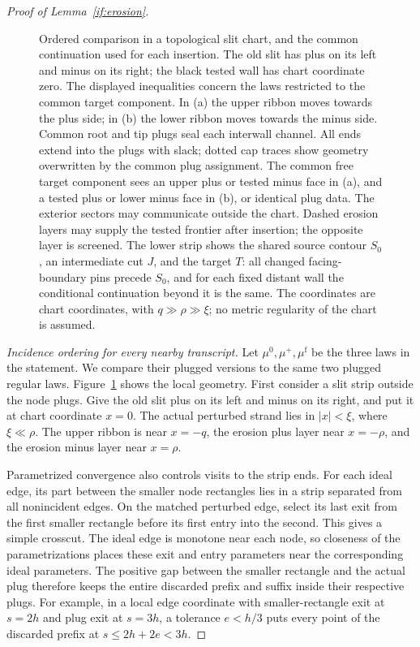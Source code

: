 \begin{proof}[Proof of Lemma~\ref{if:erosion}]
\begin{figure}[!htbp]
\centering

\caption{Ordered comparison in a topological slit chart, and the common
continuation used for each insertion. The old slit has plus on its left
and minus on its right; the black tested wall has chart coordinate zero.
The displayed inequalities concern the laws restricted to the common
target component. In (a) the upper ribbon moves towards the plus
side; in (b) the lower ribbon moves towards the minus side. Common root
and tip plugs seal each interwall channel. All ends extend into the
plugs with slack; dotted cap traces show geometry overwritten by the
common plug assignment. The common free target component sees an upper
plus or tested minus face in (a), and a tested plus or lower minus face
in (b), or identical plug data. The exterior sectors may communicate
outside the chart. Dashed erosion layers may supply the tested frontier
after insertion; the opposite layer is screened. The lower strip shows
the shared source contour $S_0$, an intermediate cut $J$, and the target
$T$: all changed facing-boundary pins precede $S_0$, and for each fixed
distant wall the conditional continuation beyond it is the same. The
coordinates are chart coordinates, with $q\gg\rho\gg\xi$; no metric
regularity of the chart is assumed.}
\label{if:slit-figure}
\end{figure}

\emph{Incidence ordering for every nearby transcript.}
Let $\mu^0,\mu^+,\mu^{\mathrm f}$ be the three laws in the statement.
We compare their plugged versions to the same two plugged regular
laws. Figure~\ref{if:slit-figure} shows the local geometry. First
consider a slit strip outside the node plugs. Give the old slit plus
on its left and minus on its right, and put it at chart coordinate
$x=0$. The actual perturbed strand lies in $|x|<\xi$, where
$\xi\ll\rho$. The upper ribbon is near $x=-q$, the erosion plus
layer near $x=-\rho$, and the erosion minus layer near $x=\rho$.

Parametrized convergence also controls visits to the strip ends.
For each ideal edge, its part between the smaller node rectangles
lies in a strip separated from all nonincident edges. On the matched
perturbed edge, select its last exit from the first smaller rectangle
before its first entry into the second. This gives a simple crosscut.
The ideal edge is monotone near each node, so closeness of the
parametrizations places these exit and entry parameters near the
corresponding ideal parameters. The positive gap between the smaller
rectangle and the actual plug therefore keeps the entire discarded
prefix and suffix inside their respective plugs. For example, in a
local edge coordinate with smaller-rectangle exit at $s=2h$ and plug
exit at $s=3h$, a tolerance $e<h/3$ puts every point of the discarded
prefix at $s\le2h+2e<3h$.


\end{proof}
